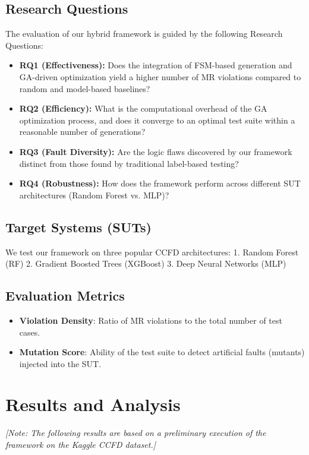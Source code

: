 \documentclass[review]{elsarticle}
\begin{document}
\subsection{Research Questions}
The evaluation of our hybrid framework is guided by the following Research Questions:

\begin{itemize}
    \item \textbf{RQ1 (Effectiveness):} Does the integration of FSM-based generation and GA-driven optimization yield a higher number of MR violations compared to random and model-based baselines?
    \item \textbf{RQ2 (Efficiency):} What is the computational overhead of the GA optimization process, and does it converge to an optimal test suite within a reasonable number of generations?
    \item \textbf{RQ3 (Fault Diversity):} Are the logic flaws discovered by our framework distinct from those found by traditional label-based testing?
    \item \textbf{RQ4 (Robustness):} How does the framework perform across different SUT architectures (Random Forest vs. MLP)?
\end{itemize}

\subsection{Target Systems (SUTs)}
We test our framework on three popular CCFD architectures:
1. Random Forest (RF)
2. Gradient Boosted Trees (XGBoost)
3. Deep Neural Networks (MLP)

\subsection{Evaluation Metrics}
\begin{itemize}
    \item \textbf{Violation Density}: Ratio of MR violations to the total number of test cases.
    \item \textbf{Mutation Score}: Ability of the test suite to detect artificial faults (mutants) injected into the SUT.
\end{itemize}

\section{Results and Analysis}
\textit{[Note: The following results are based on a preliminary execution of the framework on the Kaggle CCFD dataset.]}
\end{document}
